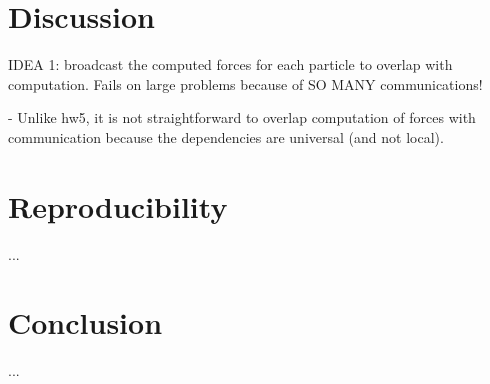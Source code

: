 \documentclass[10pt,journal,compsocconf]{IEEEtran}
\begin{document}
\section{Discussion}

IDEA 1: broadcast the computed forces for each particle to overlap with computation.
Fails on large problems because of SO MANY communications!

- Unlike hw5, it is not straightforward to overlap computation of forces with communication
  because the dependencies are universal (and not local).


\section{Reproducibility}
...

\section{Conclusion}
...
\end{document}
